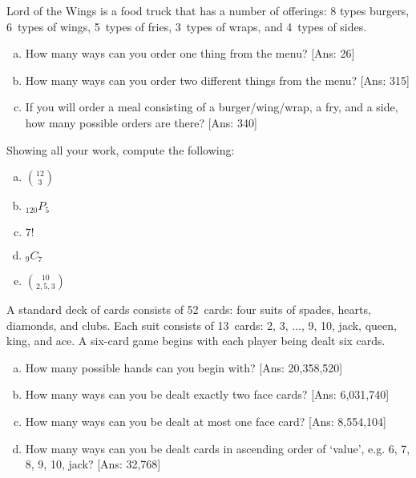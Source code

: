 \documentclass[11pt,letterpaper]{article}
\begin{document}

 Lord of the Wings is a food truck that has a number of offerings: 8 types burgers, 6~types of wings, 5~types of fries, 3~types of wraps, and 4~types of sides. 
	\begin{enumerate}[(a)]
	\item How many ways can you order one thing from the menu? [Ans: 26]
	\item How many ways can you order two different things from the menu? [Ans: 315]
	\item If you will order a meal consisting of a burger/wing/wrap, a fry, and a side, how many possible orders are there? [Ans: 340]
	\end{enumerate}



\newpage



 Showing all your work, compute the following:
	\begin{enumerate}[(a)]
	\item $\binom{12}{3}$
	\item $_{120} P_5$
	\item $7!$
	\item $_{9} C_{7}$
	\item $\binom{10}{2,5,3}$
	\end{enumerate}



\newpage



 A standard deck of cards consists of 52~cards: four suits of spades, hearts, diamonds, and clubs. Each suit consists of 13~cards: 2, 3, $\ldots$, 9, 10, jack, queen, king, and ace. A six-card game begins with each player being dealt six cards. 
	\begin{enumerate}[(a)]
	\item How many possible hands can you begin with? [Ans: 20,358,520]
	\item How many ways can you be dealt exactly two face cards? [Ans: 6,031,740]
	\item How many ways can you be dealt at most one face card? [Ans: 8,554,104]
	\item How many ways can you be dealt cards in ascending order of `value', e.g. 6, 7, 8, 9, 10, jack? [Ans: 32,768]
	\end{enumerate}
\end{document}
